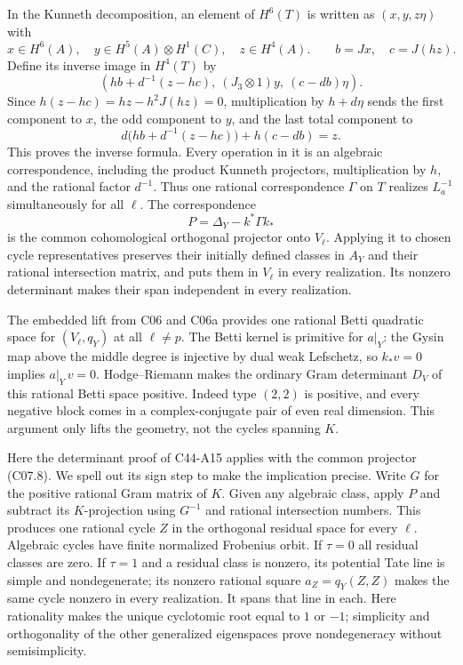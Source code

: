 \documentclass[11pt]{article}
\theoremstyle{remark}\newtheorem{remark}[theorem]{Remark}
\begin{document}
In the Kunneth decomposition, an element of $H^6(T)$
is written as $(x,y,z\eta)$ with
\[
 x\in H^6(A),\quad y\in H^5(A)\otimes H^1(C),\quad z\in H^4(A).
 \qquad b=Jx,\quad c=J(hz).
 \]
Define its inverse image in $H^4(T)$ by
\[
 \left(hb+d^{-1}(z-hc),\
                 (J_3\otimes1)y,\
                 (c-db)\eta\right).                        \tag{C07.7}
\]
Since $h(z-hc)=hz-h^2J(hz)=0$, multiplication by
$h+d\eta$ sends the first component to $x$, the odd
component to $y$, and the last total component to
\[
              d\big(hb+d^{-1}(z-hc)\big)+h(c-db)=z.
 \]
This proves the inverse formula. Every operation in it
is an algebraic correspondence, including the product
Kunneth projectors, multiplication by $h$, and the rational
factor $d^{-1}$. Thus one rational correspondence $\Gamma$
on $T$ realizes $L_a^{-1}$ simultaneously for all $\ell$.
The correspondence
\[
                       P=\Delta_Y-k^*\Gamma k_*
                                                               \tag{C07.8}
\]
is the common cohomological orthogonal projector onto
$V_\ell$. Applying it to chosen cycle representatives
preserves their initially defined classes in $A_Y$ and
their rational intersection matrix, and puts them in
$V_\ell$ in every realization. Its nonzero determinant
makes their span independent in every realization.

The embedded lift from C06 and C06a provides one rational Betti
quadratic space for $(V_\ell,q_Y)$ at all $\ell\ne p$.
The Betti kernel is primitive for $a|_Y$: the Gysin map
above the middle degree is injective by dual weak
Lefschetz, so $k_*v=0$ implies $a|_Y\,v=0$.
Hodge--Riemann makes the ordinary Gram determinant
$D_V$ of this rational Betti space positive. Indeed
type $(2,2)$ is positive, and every negative block
comes in a complex-conjugate pair of even real dimension.
This argument only lifts the geometry, not the cycles
spanning $K$.

Here the determinant proof of C44-A15 applies with
the common projector (C07.8). We spell out its sign
step to make the implication precise. Write $G$ for
the positive rational Gram matrix of $K$.
Given any algebraic class, apply $P$ and subtract its
$K$-projection using $G^{-1}$ and rational intersection
numbers. This produces one rational cycle $Z$ in the
orthogonal residual space for every $\ell$.
Algebraic cycles have finite normalized Frobenius orbit.
If $\tau=0$ all residual classes are zero.
If $\tau=1$ and a residual class is nonzero, its potential
Tate line is simple and nondegenerate; its nonzero rational
square $a_Z=q_Y(Z,Z)$ makes the same cycle nonzero in
every realization. It spans that line in each.
Here rationality makes the unique cyclotomic root equal
to $1$ or $-1$; simplicity and orthogonality of the other
generalized eigenspaces prove nondegeneracy without
semisimplicity.
\end{document}
